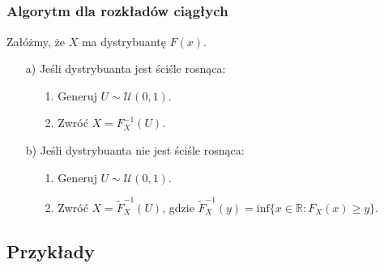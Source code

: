 \documentclass[12pt]{mwrep}
\begin{document}
	\subsubsection{Algorytm dla rozkładów ciągłych\textsuperscript{\cite{OD - dyskretny}}}
	\noindent Załóżmy, że $X$ ma dystrybuantę $F(x)$.
	\begin{enumerate}[leftmargin=10mm]
		\item[a)] Jeśli dystrybuanta jest ściśle rosnąca:
		\begin{enumerate}
			\item[1.] Generuj $U \sim \mathcal{U}(0, 1)$.
			\item[2.] Zwróć $ X = F_X^{-1}(U) $.
		\end{enumerate}
		\vspace{3mm}
		\item[b)] Jeśli dystrybuanta nie jest ściśle rosnąca:
		\begin{enumerate}
			\item[1.] Generuj $U \sim \mathcal{U}(0, 1)$.
			\item[2.] Zwróć $ X = \widetilde{F}_X^{-1}(U) $, gdzie $ \widetilde{F}_X^{-1}(y) = \mathrm{inf}\{x \in \mathbb{R}: F_X(x) \geqslant y\} $.
		\end{enumerate}
	\end{enumerate}

	\subsection{Przykłady}
	
\end{document}

